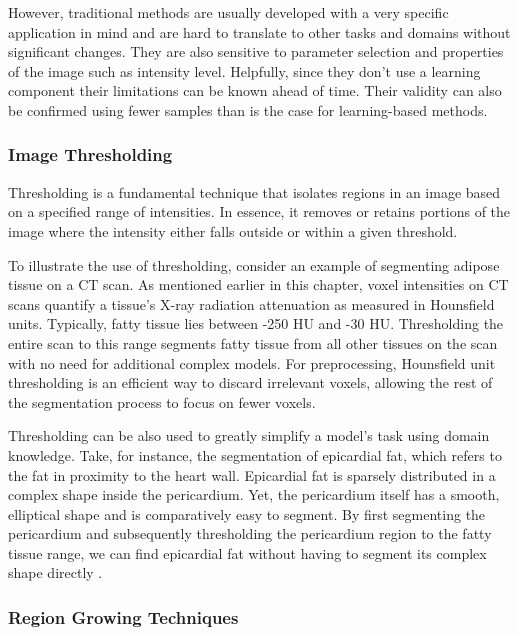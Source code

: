 However, traditional methods are usually developed with a very specific application in mind and are hard to translate to other tasks and domains without significant changes. They are also sensitive to parameter selection and properties of the image such as intensity level. Helpfully, since they don't use a learning component their limitations can be known ahead of time. Their validity can also be confirmed using fewer samples than is the case for learning-based methods.

\subsubsection{Image Thresholding}

Thresholding is a fundamental technique that isolates regions in an image based on a specified range of intensities. In essence, it removes or retains portions of the image where the intensity either falls outside or within a given threshold.

To illustrate the use of thresholding, consider an example of segmenting adipose tissue on a CT scan. As mentioned earlier in this chapter, voxel intensities on CT scans quantify a tissue's X-ray radiation attenuation as measured in Hounsfield units. Typically, fatty tissue lies between -250 HU and -30 HU. Thresholding the entire scan to this range segments fatty tissue from all other tissues on the scan with no need for additional complex models. For preprocessing, Hounsfield unit thresholding is an efficient way to discard irrelevant voxels, allowing the rest of the segmentation process to focus on fewer voxels.

Thresholding can be also used to greatly simplify a model's task using domain knowledge. Take, for instance, the segmentation of epicardial fat, which refers to the fat in proximity to the heart wall. Epicardial fat is sparsely distributed in a complex shape inside the pericardium. Yet, the pericardium itself has a smooth, elliptical shape and is comparatively easy to segment. By first segmenting the pericardium and subsequently thresholding the pericardium region to the fatty tissue range, we can find epicardial fat without having to segment its complex shape directly \cite{bencevicRecentProgressEpicardial2022}.

\subsubsection{Region Growing Techniques}


